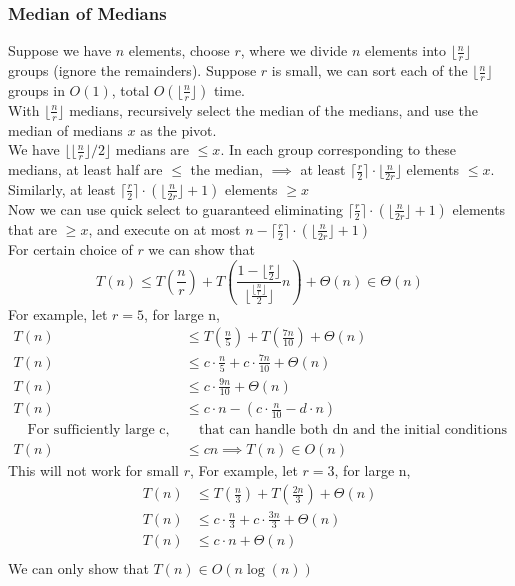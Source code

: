 \documentclass[9pt]{extarticle}
\begin{document}
\subsubsection{Median of Medians}
Suppose we have $n$ elements, choose $r$, where we divide $n$ elements into $\lfloor \frac{n}{r} \rfloor$ 
groups (ignore the remainders). Suppose $r$ is small, we can sort each of the $\lfloor \frac{n}{r} \rfloor$ groups
in $O(1)$, total $O(\lfloor \frac{n}{r} \rfloor)$ time. \\
With $\lfloor \frac{n}{r} \rfloor$ medians, recursively select the median of the medians, and use the median of medians $x$ as the pivot. \\
We have $\lfloor \lfloor \frac{n}{r} \rfloor/2\rfloor$ medians are $\leq x$. In each group corresponding to these medians, at least half are $\leq$ the median, 
$\implies$ at least $\lceil \frac{r}{2}\rceil \cdot \lfloor \frac{n}{2r}\rfloor$ elements $\leq x$.\\ 
Similarly, at least $\lceil \frac{r}{2}\rceil \cdot (\lfloor \frac{n}{2r}\rfloor + 1)$ elements $\geq x$\\
Now we can use quick select to guaranteed eliminating $\lceil \frac{r}{2}\rceil \cdot (\lfloor \frac{n}{2r}\rfloor + 1)$ elements that are $\geq x$, and execute on at most $n - \lceil \frac{r}{2}\rceil \cdot (\lfloor \frac{n}{2r}\rfloor + 1)$\\
For certain choice of $r$ we can show that 
\[T(n) \leq T(\frac{n}{r}) + T(\frac{1 - \lfloor \frac{r}{2} \rfloor}{\lfloor \frac{\lfloor \frac{n}{r}\rfloor}{2}\rfloor}n) + \Theta(n) \in \Theta(n)\]
For example, let $r=5$, for large n, 
\begin{align*}
  T(n) &\leq T(\frac{n}{5}) + T(\frac{7n}{10}) + \Theta(n)  \\
  T(n)&\leq c\cdot \frac{n}{5} + c\cdot \frac{7n}{10} + \Theta(n)\\
  T(n)&\leq c\cdot \frac{9n}{10} + \Theta(n)\\
  T(n)&\leq c\cdot n - (c\cdot \frac{n}{10} - d\cdot n)\\
\quad\text{For sufficiently large c, }&\quad\text{that can handle both dn and the initial conditions}\\
T(n)&\leq cn \implies T(n) \in O(n)
\end{align*}
This will not work for small $r$, 
For example, let $r=3$, for large n, 
\begin{align*}
  T(n) &\leq T(\frac{n}{3}) + T(\frac{2n}{3}) + \Theta(n)  \\
  T(n)&\leq c\cdot \frac{n}{3} + c\cdot \frac{3n}{3} + \Theta(n)\\
  T(n)&\leq c\cdot n + \Theta(n)\\
\end{align*}
We can only show that $T(n) \in O(n\log(n))$
\end{document}
